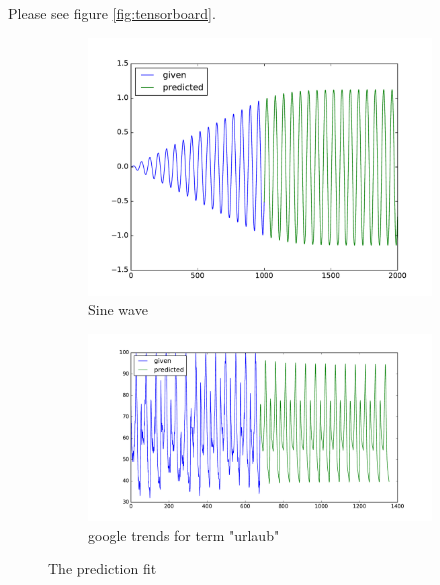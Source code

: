 \documentclass{article}
\begin{document}
\begin{enumerate}
\begin{enumerate}
		
		
		\begin{item}
			Please see  figure \ref{fig:tensorboard}. 

		\end{item}
		
		
	\end{enumerate}




		\begin{figure}[t]
			\centering
			\begin{subfigure}[b]{0.45\textwidth}
				\includegraphics[width=1\textwidth]{figures/sine}
				\caption{Sine wave}
				\label{fig:sine}
			\end{subfigure}	
			\quad
			\begin{subfigure}[b]{0.45\textwidth}
				\includegraphics[width=1\textwidth]{figures/urlaub}
				\caption{google trends for term "urlaub"}
				\label{fig:urlaub}
			\end{subfigure}	
			\caption{The prediction fit}
		\end{figure}



\end{enumerate}
\end{document}
